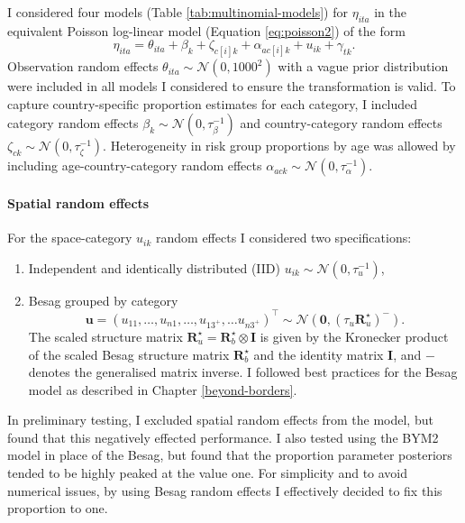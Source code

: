 \documentclass[a4paper, nobind]{templates/ociamthesis}
\providecommand{\tightlist}{%
  \setlength{\itemsep}{0pt}\setlength{\parskip}{0pt}}
\begin{document}
I considered four models (Table \ref{tab:multinomial-models}) for \(\eta_{ita}\) in the equivalent Poisson log-linear model (Equation \eqref{eq:poisson2}) of the form
\begin{equation}
\eta_{ita} = \theta_{ita} + \beta_k + \zeta_{c[i]k} + \alpha_{ac[i]k} + u_{ik} + \gamma_{tk}.
\end{equation}
Observation random effects \(\theta_{ita} \sim \mathcal{N}(0, 1000^2)\) with a vague prior distribution were included in all models I considered to ensure the transformation is valid.
To capture country-specific proportion estimates for each category, I included category random effects \(\beta_k \sim \mathcal{N}(0, \tau_\beta^{-1})\) and country-category random effects \(\zeta_{ck} \sim \mathcal{N}(0, \tau_\zeta^{-1})\).
Heterogeneity in risk group proportions by age was allowed by including age-country-category random effects \(\alpha_{ack} \sim \mathcal{N}(0, \tau_\alpha^{-1})\).

\hypertarget{spatial-random-effects}{%
\paragraph{Spatial random effects}\label{spatial-random-effects}}

For the space-category \(u_{ik}\) random effects I considered two specifications:

\begin{enumerate}
\def\labelenumi{\arabic{enumi}.}
\tightlist
\item
  Independent and identically distributed (IID) \(u_{ik} \sim \mathcal{N}(0, \tau_u^{-1})\),
\item
  Besag \autocite{besag1991bayesian} grouped by category
  \[
  \mathbf{u} = (u_{11}, \ldots, u_{n1}, \ldots, u_{1{3^{+}}}, \ldots u_{n3^{+}})^\top \sim \mathcal{N}(\mathbf{0}, (\tau_u \mathbf{R}^\star_u)^{-}).
  \]
  The scaled structure matrix \(\mathbf{R}^\star_u = \mathbf{R}^\star_b \otimes \mathbf{I}\) is given by the Kronecker product of the scaled Besag structure matrix \(\mathbf{R}^\star_b\) and the identity matrix \(\mathbf{I}\), and \({-}\) denotes the generalised matrix inverse.
  I followed best practices for the Besag model as described in Chapter \ref{beyond-borders}.
\end{enumerate}

In preliminary testing, I excluded spatial random effects from the model, but found that this negatively effected performance.
I also tested using the BYM2 model \autocite{simpson2017penalising} in place of the Besag, but found that the proportion parameter posteriors tended to be highly peaked at the value one.
For simplicity and to avoid numerical issues, by using Besag random effects I effectively decided to fix this proportion to one.
\end{document}
